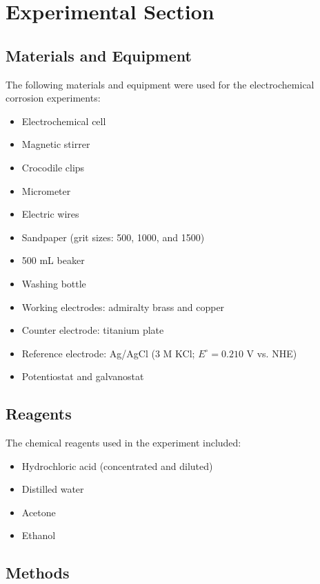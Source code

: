 \section{Experimental Section}

\subsection{Materials and Equipment}

The following materials and equipment were used for the electrochemical corrosion experiments:

\begin{itemize}
    \item Electrochemical cell
    \item Magnetic stirrer
    \item Crocodile clips
    \item Micrometer
    \item Electric wires
    \item Sandpaper (grit sizes: 500, 1000, and 1500)
    \item 500 mL beaker
    \item Washing bottle
    \item Working electrodes: admiralty brass and copper
    \item Counter electrode: titanium plate
    \item Reference electrode: Ag/AgCl (3 M KCl; \( E^\circ = 0.210 \) V vs. NHE)
    \item Potentiostat and galvanostat
\end{itemize}

\subsection{Reagents}

The chemical reagents used in the experiment included:

\begin{itemize}
    \item Hydrochloric acid (concentrated and diluted)
    \item Distilled water
    \item Acetone
    \item Ethanol
\end{itemize}

\subsection{Methods}


